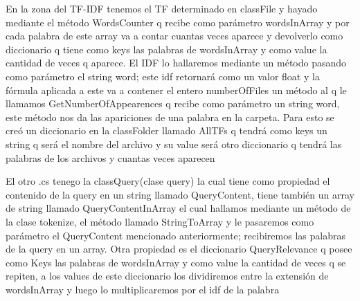 \documentclass[a4paper,12pt]{article}
\begin{document}
En la zona del TF-IDF tenemos el TF determinado en classFile y hayado mediante el método WordsCounter q recibe como parámetro wordsInArray y por cada palabra de este array va a contar cuantas veces aparece y devolverlo como diccionario q tiene como keys las palabras de wordsInArray y como value la cantidad de veces q aparece. El IDF  lo hallaremos mediante un método pasando como parámetro el string word; este idf retornará como un valor float y la fórmula aplicada a este va a contener el entero numberOfFiles un método al q le llamamos GetNumberOfAppearences q recibe como parámetro un string word, este método nos da las apariciones de una palabra en la carpeta. Para esto se creó un diccionario en la classFolder llamado AllTFs q tendrá como keys un string q será el nombre del archivo y su value será otro diccionario q tendrá las palabras de los archivos y cuantas veces aparecen

El otro .cs tenego la classQuery(clase query) la cual tiene como propiedad el contenido de la query en un string llamado QueryContent, tiene también un array de string llamado QueryContentInArray el cual hallamos mediante un método de la clase tokenize, el método llamado StringToArray y le pasaremos como parámetro el QueryContent mencionado anteriormente; recibiremos las palabras de la query en un array. Otra propiedad es el diccionario QueryRelevance q posee como Keys las palabras de wordsInArray y como value la cantidad de veces q se repiten, a los values de este diccionario los dividiremos entre la extensión de wordsInArray y luego lo multiplicaremos por el idf de la palabra
\end{document}
